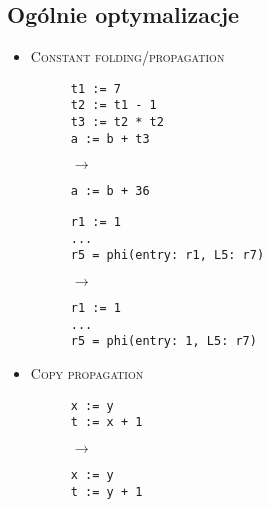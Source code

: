 
\subsection{Ogólnie optymalizacje}

\begin{itemize}
    \item \textsc{Constant folding/propagation}

\begin{figure}[H]
 \begin{minipage}{0.1\textwidth}
  \centering
  \begin{verbatim}
t1 := 7
t2 := t1 - 1
t3 := t2 * t2
a := b + t3
  \end{verbatim}
 \end{minipage}
 \begin{minipage}{0.04\textwidth}
 $\rightarrow$
 \end{minipage}
 \begin{minipage}{0.2\textwidth}
  \centering
  \begin{verbatim}
a := b + 36
  \end{verbatim}
 \end{minipage}
\end{figure}

\begin{figure}[H]
 \begin{minipage}{0.2\textwidth}
  \centering
  \begin{verbatim}
r1 := 1
...
r5 = phi(entry: r1, L5: r7) 
  \end{verbatim}
 \end{minipage}
 \begin{minipage}{0.04\textwidth}
 $\rightarrow$
 \end{minipage}
 \begin{minipage}{0.2\textwidth}
  \centering
  \begin{verbatim}
r1 := 1
...
r5 = phi(entry: 1, L5: r7) 
  \end{verbatim}
 \end{minipage}
\end{figure}

\item \textsc{Copy propagation}

\begin{figure}[H]
 \begin{minipage}{0.1\textwidth}
  \centering
  \begin{verbatim}
x := y
t := x + 1
  \end{verbatim}
 \end{minipage}
 \begin{minipage}{0.04\textwidth}
 $\rightarrow$
 \end{minipage}
 \begin{minipage}{0.2\textwidth}
  \centering
  \begin{verbatim}
x := y
t := y + 1
  \end{verbatim}
 \end{minipage}
\end{figure}


\end{itemize}
